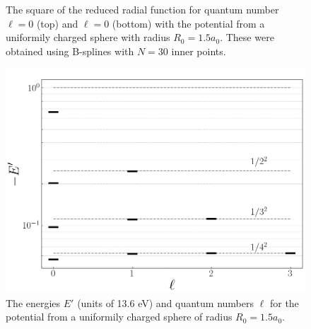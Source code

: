\documentclass[twocolumn]{article}
\begin{document}
\begin{large}
\begin{figure}[h]
    \caption{The square of the reduced radial function for quantum number $\ell=0$ (top) and $\ell=0$ (bottom) with the potential from a uniformily charged sphere with radius $R_0=1.5a_0$. These were obtained using B-splines with $N=30$ inner points.}
    \includegraphics[scale=0.35]{spectrum.png}
    \caption{The energies $E'$ (units of 13.6 eV) and quantum numbers $\ell$ for the potential from a uniformily charged sphere of radius $R_0=1.5a_0$.}
    \label{28apr1831}
\end{figure}


\end{large}
\end{document}
